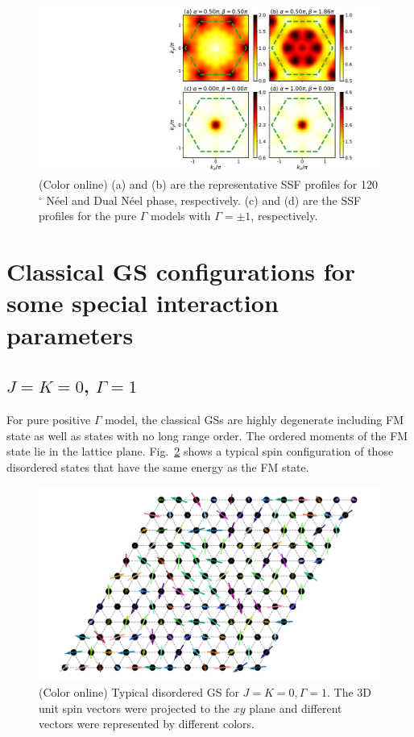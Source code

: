 \documentclass[aps,prb,reprint,amsfonts,amsmath,amssymb,showpacs,groupedaddress,superscriptaddress]{revtex4-1}
\begin{document}
\begin{figure}
    \centering
    \includegraphics[width=\columnwidth]{fig/AppendixSSF.pdf}
    \caption{\label{fig:AppendixSSF}(Color online) (a) and (b) are the representative SSF profiles for 120$^\circ$ N\'{e}el and Dual N\'{e}el phase, respectively. (c) and (d) are the SSF profiles for the pure $\Gamma$ models with $\Gamma = \pm 1$, respectively.}
\end{figure}

\section{\label{apx:DegeneratedStates}Classical GS configurations for some special interaction parameters}

\subsection{$J=K=0$, $\Gamma=1$}

For pure positive $\Gamma$ model, the classical GSs are highly degenerate including FM state as well as states with no long range order. The ordered moments of the FM state lie in the lattice plane. Fig.~\ref{fig:GSForPositiveGamma} shows a typical spin configuration of those disordered states that have the same energy as the FM state.

\begin{figure}
    \centering
    \includegraphics[width=\columnwidth]{fig/SpinConfigForPositiveGamma.pdf}
    \caption{\label{fig:GSForPositiveGamma}(Color online) Typical disordered GS for $J=K=0, \Gamma=1$. The 3D unit spin vectors were projected to the $xy$ plane and different vectors were represented by different colors.}
\end{figure}
\end{document}
